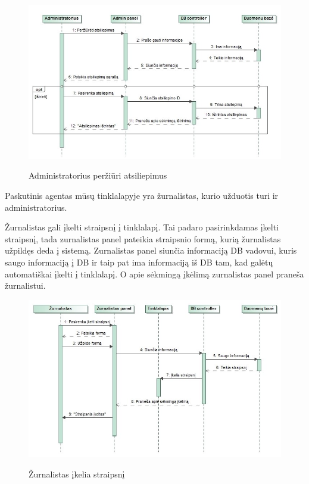 ﻿\documentclass{VUMIFPSkursinis}
\begin{document}
\begin{figure}[H]
    \centering
    \includegraphics[scale=0.45]{img/Pav/AdminAtsiliepimaiSvetaine}
    \label{img:uml15}
	\caption{Administratorius peržiūri atsiliepimus}
\end{figure}
	
Paskutinis agentas mūsų tinklalapyje yra žurnalistas, kurio užduotis turi ir administratorius.

Žurnalistas gali įkelti straipsnį į tinklalapį. Tai padaro pasirinkdamas įkelti straipsnį, tada zurnalistas panel pateikia straipsnio formą, kurią žurnalistas užpildęs deda į sistemą. Zurnalistas panel siunčia informaciją DB vadovui, kuris saugo informaciją į DB ir taip pat ima informaciją iš DB tam, kad galėtų automatiškai įkelti į tinklalapį. O apie sėkmingą įkėlimą zurnalistas panel praneša žurnalistui.

\begin{figure}[H]
    \centering
    \includegraphics[scale=0.45]{img/Pav/ZurnalistasIkeliaStraipsni}
    \label{img:uml16}
	\caption{Žurnalistas įkelia straipsnį}
\end{figure}
\end{document}
